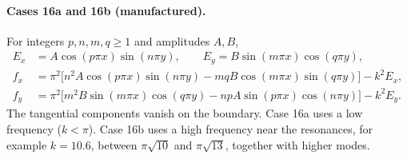 \documentclass[11pt]{article}
\begin{document}
\paragraph{Cases 16a and 16b (manufactured).}
For integers $p,n,m,q\ge1$ and amplitudes $A,B$,
\[
\begin{aligned}
E_x&=A\cos(p\pi x)\sin(n\pi y),\qquad
E_y=B\sin(m\pi x)\cos(q\pi y),\\
f_x&=\pi^2\bigl[n^2A\cos(p\pi x)\sin(n\pi y)-mqB\cos(m\pi x)\sin(q\pi y)\bigr]-k^2E_x,\\
f_y&=\pi^2\bigl[m^2B\sin(m\pi x)\cos(q\pi y)-npA\sin(p\pi x)\cos(n\pi y)\bigr]-k^2E_y.
\end{aligned}
\]
The tangential components vanish on the boundary. Case 16a uses a low
frequency ($k<\pi$). Case 16b uses a high frequency near the resonances,
for example $k=10.6$, between $\pi\sqrt{10}$ and $\pi\sqrt{13}$, together
with higher modes.
\end{document}
